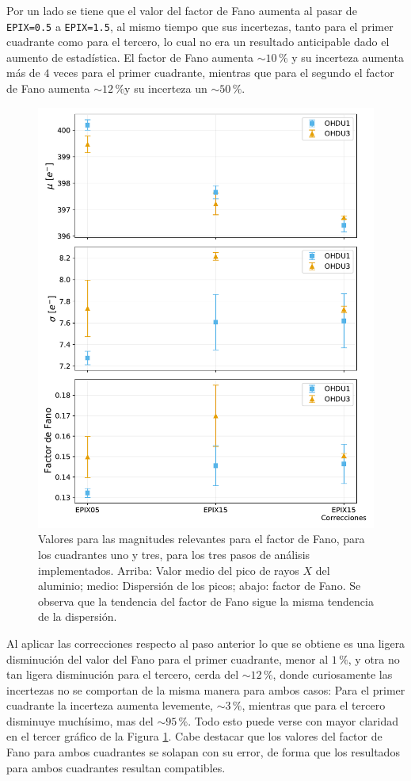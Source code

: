 Por un lado se tiene que el valor del factor de Fano aumenta al pasar de \verb|EPIX=0.5| a \verb|EPIX=1.5|, al mismo tiempo que sus incertezas, tanto para el primer cuadrante como para el tercero, lo cual no era un resultado anticipable dado el aumento de estadística. El factor de Fano aumenta $\sim 10\,\%$ y su incerteza aumenta más de $4$ veces para el primer cuadrante, mientras que para el segundo el factor de Fano aumenta $\sim 12\,\%$y su incerteza un $\sim 50\,\%$.

\begin{figure}[h]
    \centering
        \includegraphics[scale=0.5]{Figs/Al_mu_sigma_fano.pdf}
    \caption{\footnotesize{Valores para las magnitudes relevantes para el factor de Fano, para los cuadrantes uno y tres, para los tres pasos de análisis implementados. Arriba: Valor medio del pico de rayos $X$ del aluminio; medio: Dispersión de los picos; abajo: factor de Fano. Se observa que la tendencia del factor de Fano sigue la misma tendencia de la dispersión.}}
    \label{fig:Al_mu_sigma_fano}
\end{figure}
Al aplicar las correcciones respecto al paso anterior lo que se obtiene es una ligera disminución del valor del Fano para el primer cuadrante, menor al $1\,\%$, y otra no tan ligera disminución para el tercero, cerda del $\sim 12\,\%$, donde curiosamente las incertezas no se comportan de la misma manera para ambos casos: Para el primer cuadrante la incerteza aumenta levemente, $\sim 3\,\%$, mientras que para el tercero disminuye muchísimo, mas del $\sim 95\,\%$. Todo esto puede verse con mayor claridad en el tercer gráfico de la Figura \ref{fig:Al_mu_sigma_fano}. Cabe destacar que los valores del factor de Fano para ambos cuadrantes se solapan con su error, de forma que los resultados para ambos cuadrantes resultan compatibles.


